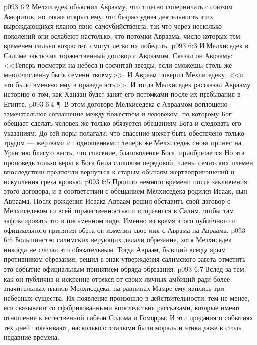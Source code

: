 \vs p093 6:2 Мелхиседек объяснил Аврааму, что тщетно соперничать с союзом Аморитов, но также открыл ему, что безрассудная деятельность этих вырождающихся кланов явно самоубийственна, так что через несколько поколений они ослабеют настолько, что потомки Авраама, число которых тем временем сильно возрастет, смогут легко их победить.
\vs p093 6:3 И Мелхиседек в Салиме заключил торжественный договор с Авраамом. Сказал он Аврааму: <<Теперь посмотри на небеса и сосчитай звезды, если сможешь; столь же многочисленну быть семени твоему>>. И Авраам поверил Мехлиседеку, <<и это было вменено ему в праведность>>. И тогда Мелхиседек рассказал Аврааму историю о том, как Ханаан будет занят его потомками после их пребывания в Египте.
\vs p093 6:4 \P\ В этом договоре Мелхиседека с Авраамом воплощено замечательное соглашение между божеством и человеком, по которому Бог обещает сделать  человек же только обязуется  обещаниям Бога и следовать его указаниям. До сей поры полагали, что спасение может быть обеспечено только трудом --- жертвами и подношениями; теперь же Мелхиседек снова принес на Урантию благую весть, что спасение, благоволение Бога, приобретается  Но эта проповедь только веры в Бога была слишком передовой; члены семитских племен впоследствии предпочли вернуться к старым обычаям жертвоприношений и искупления греха кровью.
\vs p093 6:5 Прошло немного времени после заключения этого договора, и в соответствии с обещанием Мелхиседека родился Исаак, сын Авраама. После рождения Исаака Авраам решил обставить свой договор с Мелхиседеком со всей торжественностью и отправился в Салим, чтобы там зафиксировать это в письменном виде. Именно во время этого публичного и официального принятия обета он изменил свое имя с Аврама на Авраама.
\vs p093 6:6 Большинство салимских верующих делали обрезание, хотя Мелхиседек никогда не считал это обязательным. Тогда Авраам, бывший всегда ярым противником обрезания, решил в знак утверждения салимского завета отметить это событие официальным принятием обряда обрезания.
\vs p093 6:7 Вслед за тем, как он публично и искренне отрекся от своих личных амбиций ради более значительных планов Мелхиседека, на равнинах Мамре ему явились три небесных существа. Их появление произошло в действительности, тем не менее, его связывают со сфабрикованными впоследствии рассказами, которые имеют отношение к естественной гибели Содома и Гоморры. И эти предания о событиях тех дней показывают, насколько отсталыми были мораль и этика даже в столь недавние времена.
